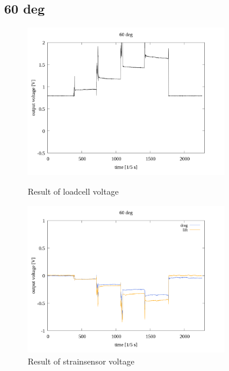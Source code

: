 \documentclass[twocolumn,a4j]{jsarticle}
\begin{document}
\subsection{60 deg}
\begin{figure}[htbp]
    \footnotesize
    \begin{center}
        \includegraphics[width=88mm]{../images/reverse/60_loadcell.png}
        \caption{Result of loadcell voltage}
        \includegraphics[width=88mm]{../images/reverse/60_strainsensor.png}
        \caption{Result of strainsensor voltage}
    \end{center}
\end{figure}

\newpage
\end{document}
